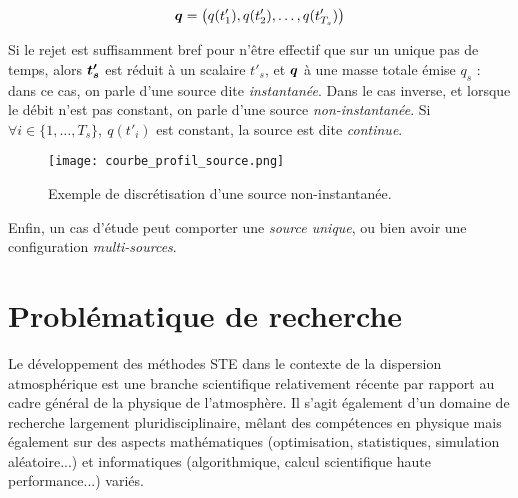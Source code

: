 	$$ {\bm{q}} = \left(q(t'_1), q(t'_2), \dots, q(t'_{T_s})\right)$$
	
	Si le rejet est suffisamment bref pour n'être effectif que sur un unique pas de temps, alors ${\bm{t'_s}}$ est réduit à un scalaire $t'_s$, et ${\bm{q}}$ à une masse totale émise $q_s$ : dans ce cas, on parle d'une source dite \textit{instantanée}. Dans le cas inverse, et lorsque le débit n'est pas constant, on parle d'une source \textit{non-instantanée}. Si $ \forall i \in \{1, \dots, T_s\}, ~ q(t'_i)$ est constant, la source est dite \textit{continue}. \\
	
	
	\begin{figure}[hb]
		\centering
		\texttt{[image: courbe\_profil\_source.png]}
		\caption{Exemple de discrétisation d'une source non-instantanée.}
		\label{fig_courbe_profil_source}
	\end{figure}
	
	Enfin, un cas d'étude peut comporter une \textit{source unique}, ou bien avoir une configuration \textit{multi-sources}.\\
	
	


\section{Problématique de recherche}

Le développement des méthodes STE dans le contexte de la dispersion atmosphérique est une branche scientifique relativement récente par rapport au cadre général de la physique de l'atmosphère. Il s'agit également d'un domaine de recherche largement pluridisciplinaire, mêlant des compétences en physique mais également sur des aspects mathématiques (optimisation, statistiques, simulation aléatoire...) et informatiques (algorithmique, calcul scientifique haute performance...) variés. \\

